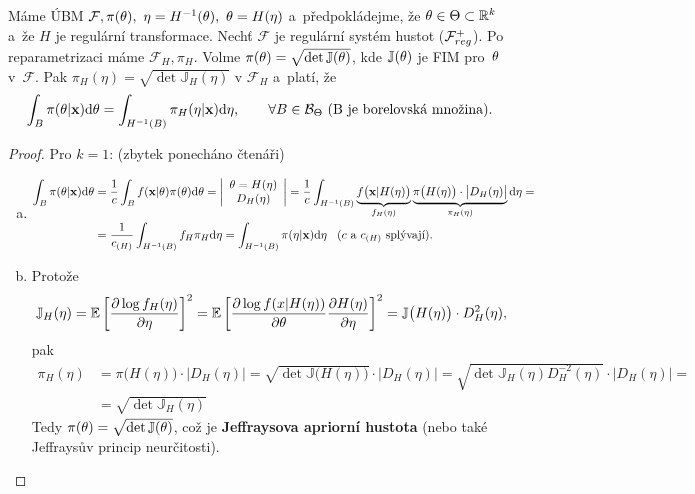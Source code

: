 \begin{theorem}[Jeffreys]
	Máme ÚBM $\mathcal{F},\pi(\theta),~\eta=H^{-1}(\theta),~\theta=H(\eta)$ a~předpokládejme, že $\theta\in\Theta\subset\mathbb{R}^k$ a~že $H$ je regulární transformace. Nechť $\mathcal{F}$ je regulární systém hustot ($\mathcal{F}_{reg}^+$). Po reparametrizaci máme $\mathcal{F}_H,\pi_H$. Volme $\pi(\theta)=\sqrt{\det \mathbb{J}(\theta)}$, kde $\mathbb{J}(\theta)$ je FIM pro~$\theta$ v~$\mathcal{F}$. Pak $\pi_H(\eta)=\sqrt{\det \mathbb{J}_H(\eta)}$ v $\mathcal{F}_H$ a~platí, že 
	$$ \int_B\pi(\theta|\textbf{x})\mathrm{d}\theta=\int_{H^{-1}(B)}\pi_H(\eta|\textbf{x})\mathrm{d}\eta,\qquad\forall B\in\mathcal{B}_\Theta \text{ (B je borelovská množina).}$$
	\begin{proof}
		Pro $k=1$: (zbytek ponecháno čtenáři)\begin{enumerate}[a)]
			\item \[
			\begin{split}
			\int_B\pi(\theta|\textbf{x})\mathrm{d}\theta&=\frac{1}{c}\int_B f(\textbf{x}|\theta)\pi(\theta)\mathrm{d}\theta=\left|\begin{array}{c}
			\theta=H(\eta)\\D_H(\eta)
			\end{array}
			\right|=\frac{1}{c}\int_{H^{-1}(B)}\underbrace{f\big(\textbf{x}|H(\eta)\big)}_{f_H(\eta)}\underbrace{\pi\big(H(\eta)\big)\cdot\big|D_H(\eta)\big|}_{\pi_H(\eta)}\mathrm{d}\eta=\\&=\frac{1}{c_{(H)}}\int_{H^{-1}(B)}f_H\pi_H\mathrm{d}\eta=\int_{H^{-1}(B)}\pi(\eta|\textbf{x})\mathrm{d}\eta \hspace{0.3cm} (c \text{ a } c_{(H)} \text{ splývají}).
			\end{split}
			\]
			\item Protože 
			$$ \mathbb{J}_H(\eta)=\mathbb{E}\left[ \frac{\partial\log f_H(\eta)}{\partial\eta} \right]^2=\mathbb{E}\left[ \frac{\partial\log f(x|H(\eta))}{\partial\theta}\frac{\partial H(\eta)}{\partial\eta} \right]^2=\mathbb{J}\big(H(\eta)\big) \cdot D_H^2(\eta) ,$$
			pak \[
			\begin{split}
			\pi_H(\eta)&=\pi\big(H(\eta)\big)\cdot\big|D_H(\eta)\big|=\sqrt{\det \mathbb{J}\big(H(\eta)\big)}\cdot\big|D_H(\eta)\big|=\sqrt{\det \mathbb{J}_H(\eta)D_H^{-2}(\eta)}\cdot\big|D_H(\eta)\big|=\\&=\sqrt{\det \mathbb{J}_H(\eta)}
			\end{split}
			\]
			Tedy $\pi(\theta)=\sqrt{\det \mathbb{J}(\theta)}$, což je \textbf{Jeffraysova apriorní hustota} (nebo také Jeffraysův princip neurčitosti).
		\end{enumerate}
	\end{proof}
\end{theorem}
